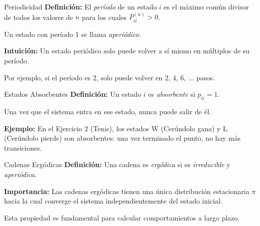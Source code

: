 \documentclass{beamer}
\begin{document}
\begin{frame}{Periodicidad}
    \small
    \textbf{Definición:} El \textit{período} de un estado $i$ es el máximo común divisor de todos los valores de $n$ para los cuales $P_{ii}^{(n)} > 0$.

    \vspace{0.5em}

    Un estado con período 1 se llama \textit{aperiódico}.

    \vspace{1em}

    \textbf{Intuición:} Un estado periódico solo puede volver a sí mismo en múltiplos de su período.

    \vspace{0.5em}

    Por ejemplo, si el período es 2, solo puede volver en 2, 4, 6, ... pasos.
\end{frame}

\begin{frame}{Estados Absorbentes}
    \small
    \textbf{Definición:} Un estado $i$ es \textit{absorbente} si $p_{ii} = 1$.

    \vspace{0.5em}

    Una vez que el sistema entra en ese estado, nunca puede salir de él.

    \vspace{1em}

    \textbf{Ejemplo:} En el Ejercicio 2 (Tenis), los estados W (Cerúndolo gana) y L (Cerúndolo pierde) son absorbentes: una vez terminado el punto, no hay más transiciones.
\end{frame}

\begin{frame}{Cadenas Ergódicas}
    \small
    \textbf{Definición:} Una cadena es \textit{ergódica} si es \textit{irreducible} y \textit{aperiódica}.

    \vspace{1em}

    \textbf{Importancia:} Las cadenas ergódicas tienen una única distribución estacionaria $\pi$ hacia la cual converge el sistema independientemente del estado inicial.

    \vspace{0.5em}

    Esta propiedad es fundamental para calcular comportamientos a largo plazo.
\end{frame}

\end{document}
